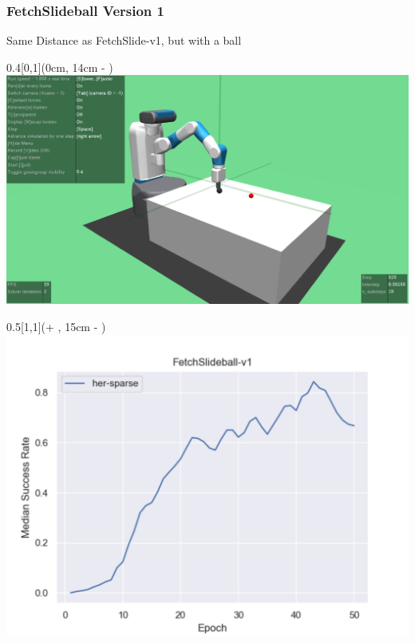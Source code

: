 \begin{frame}
	\frametitle{FetchSlideball Version 1}	
	\vspace{1cm}
	
	Same Distance as FetchSlide-v1, but with a ball
	
	
    \begin{textblock*}{0.4\paperwidth}[0,1](0cm, 14cm - \PraesentationSeitenrand)%
        \includegraphics[width=0.4\paperwidth]{./Ressourcen/Figures/FetchSlideball-v1.pdf}
    \end{textblock*}
    
    
    \begin{textblock*}{0.5\paperwidth}[1,1](\textwidth + \PraesentationSeitenrand, 15cm - \PraesentationSeitenrand)%
    	\includegraphics[width=0.5\paperwidth]{./Ressourcen/Figures/fig_FetchSlideball-v1.pdf}
    \end{textblock*}
	
	
\end{frame}
\clearpage


